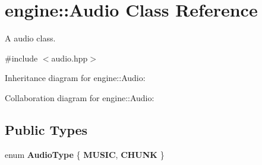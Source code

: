 \hypertarget{classengine_1_1_audio}{}\section{engine\+:\+:Audio Class Reference}
\label{classengine_1_1_audio}


A audio class.  




{\ttfamily \#include $<$audio.\+hpp$>$}



Inheritance diagram for engine\+:\+:Audio\+:


Collaboration diagram for engine\+:\+:Audio\+:
\subsection*{Public Types}
\begin{DoxyCompactItemize}
\item 
enum {\bfseries Audio\+Type} \{ {\bfseries M\+U\+S\+IC}, 
{\bfseries C\+H\+U\+NK}
 \}\hypertarget{classengine_1_1_audio_a67352b26a495af6b26a02f8ffa773edb}{}\label{classengine_1_1_audio_a67352b26a495af6b26a02f8ffa773edb}

\end{DoxyCompactItemize}
